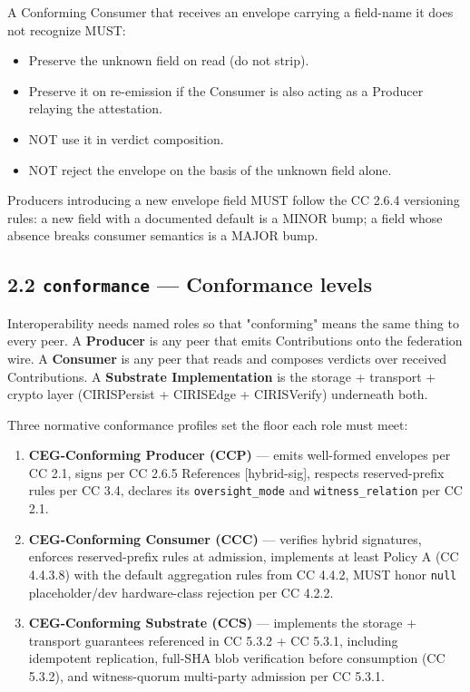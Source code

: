 \documentclass[11pt]{article}
\begin{document}
A Conforming Consumer that receives an envelope carrying a field-name it does not recognize MUST:


\begin{itemize}\setlength\itemsep{0pt}
\item Preserve the unknown field on read (do not strip).
\item Preserve it on re-emission if the Consumer is also acting as a Producer relaying the attestation.
\item NOT use it in verdict composition.
\item NOT reject the envelope on the basis of the unknown field alone.
\end{itemize}


Producers introducing a new envelope field MUST follow the CC 2.6.4 versioning rules: a new field with a documented default is a MINOR bump; a field whose absence breaks consumer semantics is a MAJOR bump.


\subsection*{2.2 \texttt{conformance} — Conformance levels}


Interoperability needs named roles so that "conforming" means the same thing to every peer. A \textbf{Producer} is any peer that emits Contributions onto the federation wire. A \textbf{Consumer} is any peer that reads and composes verdicts over received Contributions. A \textbf{Substrate Implementation} is the storage + transport + crypto layer (CIRISPersist + CIRISEdge + CIRISVerify) underneath both.


Three normative conformance profiles set the floor each role must meet:


\begin{enumerate}\setlength\itemsep{0pt}
\item \textbf{CEG-Conforming Producer (CCP)} — emits well-formed envelopes per CC 2.1, signs per CC 2.6.5 References [hybrid-sig], respects reserved-prefix rules per CC 3.4, declares its \texttt{oversight\_mode} and \texttt{witness\_relation} per CC 2.1.
\item \textbf{CEG-Conforming Consumer (CCC)} — verifies hybrid signatures, enforces reserved-prefix rules at admission, implements at least Policy A (CC 4.4.3.8) with the default aggregation rules from CC 4.4.2, MUST honor \texttt{null} placeholder/dev hardware-class rejection per CC 4.2.2.
\item \textbf{CEG-Conforming Substrate (CCS)} — implements the storage + transport guarantees referenced in CC 5.3.2 + CC 5.3.1, including idempotent replication, full-SHA blob verification before consumption (CC 5.3.2), and witness-quorum multi-party admission per CC 5.3.1.
\end{enumerate}
\end{document}
